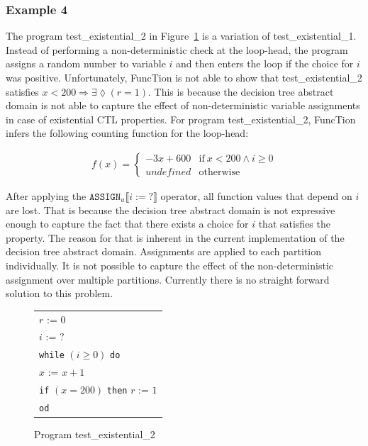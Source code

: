\documentclass[11pt,a4paper,titlepage]{article}
\theoremstyle{definition}
\begin{document}
\subsubsection*{Example 4}
The program \textsf{test\_existential\_2} in Figure~\ref{fig:test_existential_2} is a variation of \textsf{test\_existential\_1}.
Instead of performing a non-deterministic check at the loop-head, the program assigns a random number to variable $i$ and then
enters the loop if the choice for $i$ was positive. 
Unfortunately, FuncTion is not able to show that \textsf{test\_existential\_2} 
satisfies $x < 200 \Rightarrow \exists\lozenge(r = 1)$. 
This is because the decision tree abstract domain is not able 
to capture the effect of non-deterministic variable assignments in 
case of existential CTL properties. 
For program \textsf{test\_existential\_2}, FuncTion infers the following counting function for the loop-head:

\begin{align*}
f(x) = \begin{cases}
    -3x + 600  & \text{if} \ x < 200 \land i \geq 0 \\
    undefined  & \text{otherwise}
\end{cases}
\end{align*}

After applying the $\mathtt{ASSIGN}_u\llbracket i := ? \rrbracket $ operator,
all function values that depend on $i$ are lost. That is because the 
decision tree abstract domain is not expressive enough to capture the fact 
that there exists a choice for $i$ that satisfies the property. 
The reason for that is inherent in the current implementation of the decision tree abstract 
domain. Assignments are applied to each partition individually. It is not possible to capture
the effect of the non-deterministic assignment over multiple partitions.
Currently there is no straight forward solution to this problem. 

\begin{figure}
    \begin{center}
        \begin{tabular}{l}
            $r$ := $0$ \\
            $i$ := $?$ \\
            \texttt{while} $(i \geq 0)$ \texttt{do} \\
            \hspace{1em}$x$ := $x + 1$ \\
            \hspace{1em}\texttt{if} $(x = 200)$ \texttt{then} $r$ := $1$ \\
            \texttt{od}
        \end{tabular}
    \end{center}
    \vspace{-1em}
    \caption{Program \textsf{test\_existential\_2}}
    \label{fig:test_existential_2}
\end{figure}
\end{document}
